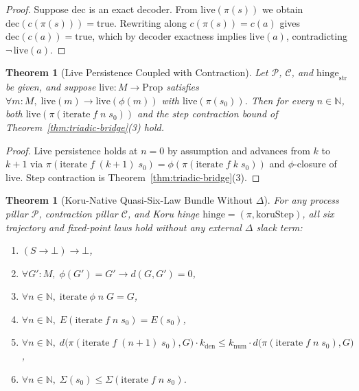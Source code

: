 \documentclass[12pt,a4paper]{article}
\newtheorem{theorem}[thm]{Theorem}
\begin{document}
\begin{proof}
Suppose $\mathrm{dec}$ is an exact decoder. From $\mathrm{live}(\pi(s))$ we obtain $\mathrm{dec}(c(\pi(s))) = \mathrm{true}$. Rewriting along $c(\pi(s)) = c(a)$ gives $\mathrm{dec}(c(a)) = \mathrm{true}$, which by decoder exactness implies $\mathrm{live}(a)$, contradicting $\neg\,\mathrm{live}(a)$.
\end{proof}

\begin{theorem}[Live Persistence Coupled with Contraction]
\label{thm:live-persistence}
Let $\mathcal{P}$, $\mathcal{C}$, and $\mathrm{hinge}_{\mathrm{str}}$ be given, and suppose $\mathrm{live} : M \to \mathrm{Prop}$ satisfies $\forall m : M,\; \mathrm{live}(m) \to \mathrm{live}(\phi(m))$ with $\mathrm{live}(\pi(s_0))$. Then for every $n \in \mathbb{N}$, both $\mathrm{live}(\pi(\mathrm{iterate}\;f\;n\;s_0))$ and the step contraction bound of Theorem~\ref{thm:triadic-bridge}(3) hold.
\end{theorem}

\begin{proof}
Live persistence holds at $n = 0$ by assumption and advances from $k$ to $k+1$ via $\pi(\mathrm{iterate}\;f\;(k+1)\;s_0) = \phi(\pi(\mathrm{iterate}\;f\;k\;s_0))$ and $\phi$-closure of $\mathrm{live}$. Step contraction is Theorem~\ref{thm:triadic-bridge}(3).
\end{proof}

\begin{theorem}[Koru-Native Quasi-Six-Law Bundle Without $\Delta$]
\label{thm:koru-quasi-six-x3}
For any process pillar $\mathcal{P}$, contraction pillar $\mathcal{C}$, and Koru hinge $\mathrm{hinge} = (\pi, \mathrm{koruStep})$, all six trajectory and fixed-point laws hold without any external $\Delta$ slack term:
\begin{enumerate}
  \item $(S \to \bot) \to \bot$,
  \item $\forall G' : M,\; \phi(G') = G' \to d(G, G') = 0$,
  \item $\forall n \in \mathbb{N},\; \mathrm{iterate}\;\phi\;n\;G = G$,
  \item $\forall n \in \mathbb{N},\; E(\mathrm{iterate}\;f\;n\;s_0) = E(s_0)$,
  \item $\forall n \in \mathbb{N},\; d\bigl(\pi(\mathrm{iterate}\;f\;(n+1)\;s_0), G\bigr) \cdot k_{\mathrm{den}} \le k_{\mathrm{num}} \cdot d\bigl(\pi(\mathrm{iterate}\;f\;n\;s_0), G\bigr)$,
  \item $\forall n \in \mathbb{N},\; \Sigma(s_0) \le \Sigma(\mathrm{iterate}\;f\;n\;s_0)$.
\end{enumerate}
\end{theorem}
\end{document}
